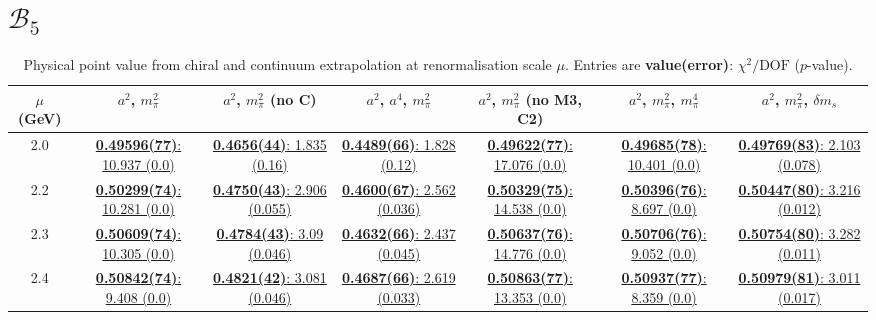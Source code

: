 \documentclass[12pt]{extarticle}
\begin{document}
\section{$\mathcal{B}_5$}
\begin{table}[h!]
\begin{center}
\begin{tabular}{|c|c|c|c|c|c|c|}
\hline
$\mu$ (GeV) & $a^2$, $m_\pi^2$& $a^2$, $m_\pi^2$ (no C)& $a^2$, $a^4$, $m_\pi^2$& $a^2$, $m_\pi^2$ (no M3, C2)& $a^2$, $m_\pi^2$, $m_\pi^4$& $a^2$, $m_\pi^2$, $\delta m_s$\\
\hline
2.0& \hyperlink{TT/SUSY/a2m2_20.pdf.1}{\textbf{0.49596(77)}: 10.937 (0.0)} & \hyperlink{TT/SUSY/a2m2noC_20.pdf.1}{\textbf{0.4656(44)}: 1.835 (0.16)} & \hyperlink{TT/SUSY/a2a4m2_20.pdf.1}{\textbf{0.4489(66)}: 1.828 (0.12)} & \hyperlink{TT/SUSY/a2m2mcut_20.pdf.1}{\textbf{0.49622(77)}: 17.076 (0.0)} & \hyperlink{TT/SUSY/a2m2m4_20.pdf.1}{\textbf{0.49685(78)}: 10.401 (0.0)} & \hyperlink{TT/SUSY/a2m2delm_20.pdf.1}{\textbf{0.49769(83)}: 2.103 (0.078)}\\
2.2& \hyperlink{TT/SUSY/a2m2_22.pdf.1}{\textbf{0.50299(74)}: 10.281 (0.0)} & \hyperlink{TT/SUSY/a2m2noC_22.pdf.1}{\textbf{0.4750(43)}: 2.906 (0.055)} & \hyperlink{TT/SUSY/a2a4m2_22.pdf.1}{\textbf{0.4600(67)}: 2.562 (0.036)} & \hyperlink{TT/SUSY/a2m2mcut_22.pdf.1}{\textbf{0.50329(75)}: 14.538 (0.0)} & \hyperlink{TT/SUSY/a2m2m4_22.pdf.1}{\textbf{0.50396(76)}: 8.697 (0.0)} & \hyperlink{TT/SUSY/a2m2delm_22.pdf.1}{\textbf{0.50447(80)}: 3.216 (0.012)}\\
2.3& \hyperlink{TT/SUSY/a2m2_23.pdf.1}{\textbf{0.50609(74)}: 10.305 (0.0)} & \hyperlink{TT/SUSY/a2m2noC_23.pdf.1}{\textbf{0.4784(43)}: 3.09 (0.046)} & \hyperlink{TT/SUSY/a2a4m2_23.pdf.1}{\textbf{0.4632(66)}: 2.437 (0.045)} & \hyperlink{TT/SUSY/a2m2mcut_23.pdf.1}{\textbf{0.50637(76)}: 14.776 (0.0)} & \hyperlink{TT/SUSY/a2m2m4_23.pdf.1}{\textbf{0.50706(76)}: 9.052 (0.0)} & \hyperlink{TT/SUSY/a2m2delm_23.pdf.1}{\textbf{0.50754(80)}: 3.282 (0.011)}\\
2.4& \hyperlink{TT/SUSY/a2m2_24.pdf.1}{\textbf{0.50842(74)}: 9.408 (0.0)} & \hyperlink{TT/SUSY/a2m2noC_24.pdf.1}{\textbf{0.4821(42)}: 3.081 (0.046)} & \hyperlink{TT/SUSY/a2a4m2_24.pdf.1}{\textbf{0.4687(66)}: 2.619 (0.033)} & \hyperlink{TT/SUSY/a2m2mcut_24.pdf.1}{\textbf{0.50863(77)}: 13.353 (0.0)} & \hyperlink{TT/SUSY/a2m2m4_24.pdf.1}{\textbf{0.50937(77)}: 8.359 (0.0)} & \hyperlink{TT/SUSY/a2m2delm_24.pdf.1}{\textbf{0.50979(81)}: 3.011 (0.017)}\\
\hline
\end{tabular}
\caption{Physical point value from chiral and continuum extrapolation at renormalisation scale $\mu$. Entries are \textbf{value(error)}: $\chi^2/\text{DOF}$ ($p$-value).}
\end{center}
\end{table}
\end{document}
